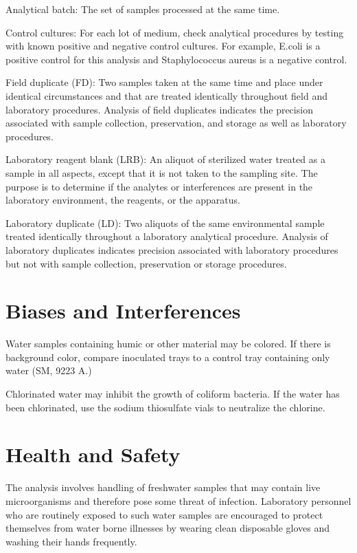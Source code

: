 \documentclass[12pt]{../SOP4_alpha}\usepackage[]{graphicx}\usepackage[]{xcolor}
\begin{document}
\NP Analytical batch: The set of samples processed at the same time. 

\NP Control cultures: For each lot of medium, check analytical procedures by
testing with known positive and negative control cultures. For example,
E.coli is a positive control for this analysis and Staphylococcus aureus is a
negative control.

\NP Field duplicate (FD): Two samples taken at the same time and place under
identical circumstances and that are treated identically throughout field
and laboratory procedures. Analysis of field duplicates indicates the
precision associated with sample collection, preservation, and storage as
well as laboratory procedures.

\NP Laboratory reagent blank (LRB): An aliquot of sterilized water treated as a
sample in all aspects, except that it is not taken to the sampling site. The
purpose is to determine if the analytes or interferences are present in the
laboratory environment, the reagents, or the apparatus.

\NP Laboratory duplicate (LD): Two aliquots of the same environmental sample
treated identically throughout a laboratory analytical procedure. Analysis
of laboratory duplicates indicates precision associated with laboratory
procedures but not with sample collection, preservation or storage
procedures. 


\section{Biases and Interferences}
\NP Water samples containing humic or other material may be colored. If there is
background color, compare inoculated trays to a control tray containing only
water (SM, 9223 A.) 

\NP Chlorinated water may inhibit the growth of coliform bacteria. If the water has been 
chlorinated, use the sodium thiosulfate vials to neutralize the chlorine.

\section{Health and Safety}

\NP The analysis involves handling of freshwater samples that may contain live
microorganisms and therefore pose some threat of infection. Laboratory personnel
who are routinely exposed to such water samples are encouraged to protect
themselves from water borne illnesses by wearing clean disposable gloves and
washing their hands frequently.
\end{document}
